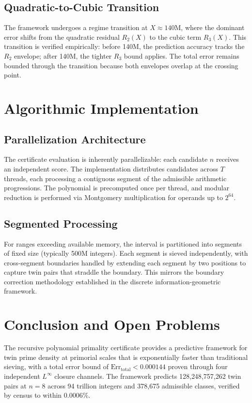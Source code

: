 \documentclass[11pt]{article}
\begin{document}
\subsection{Quadratic-to-Cubic Transition}

The framework undergoes a regime transition at $X \approx 140\mathrm{M}$, where
the dominant error shifts from the quadratic residual $R_2(X)$ to the cubic
term $R_3(X)$. This transition is verified empirically: before 140M, the
prediction accuracy tracks the $R_2$ envelope; after 140M, the tighter $R_3$
bound applies. The total error remains bounded through the transition because
both envelopes overlap at the crossing point.

\section{Algorithmic Implementation}
\label{sec:implementation}

\subsection{Parallelization Architecture}

The certificate evaluation is inherently parallelizable: each candidate $n$
receives an independent score. The implementation distributes candidates across
$T$ threads, each processing a contiguous segment of the admissible arithmetic
progressions. The polynomial is precomputed once per thread, and modular
reduction is performed via Montgomery multiplication for operands up to $2^{64}$.

\subsection{Segmented Processing}

For ranges exceeding available memory, the interval is partitioned into segments
of fixed size (typically 500M integers). Each segment is sieved independently,
with cross-segment boundaries handled by extending each segment by two positions
to capture twin pairs that straddle the boundary. This mirrors the boundary
correction methodology established in the discrete information-geometric framework.

\section{Conclusion and Open Problems}
\label{sec:conclusion}

The recursive polynomial primality certificate provides a predictive framework
for twin prime density at primorial scales that is exponentially faster than
traditional sieving, with a total error bound of $\mathrm{Err}_\mathrm{total}
< 0.000144$ proven through four independent $L^\infty$ closure channels.
The framework predicts 128{,}248{,}757{,}262 twin pairs at $n=8$ across
94 trillion integers and 378{,}675 admissible classes, verified by census to
within 0.0006\%.
\end{document}
